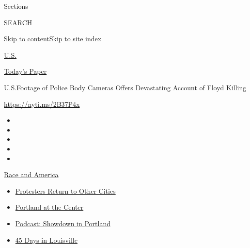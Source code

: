 Sections

SEARCH

\protect\hyperlink{site-content}{Skip to
content}\protect\hyperlink{site-index}{Skip to site index}

\href{https://www.nytimes3xbfgragh.onion/section/us}{U.S.}

\href{https://myaccount.nytimes3xbfgragh.onion/auth/login?response_type=cookie\&client_id=vi}{}

\href{https://www.nytimes3xbfgragh.onion/section/todayspaper}{Today's
Paper}

\href{/section/us}{U.S.}\textbar{}Footage of Police Body Cameras Offers
Devastating Account of Floyd Killing

\url{https://nyti.ms/2B37P4x}

\begin{itemize}
\item
\item
\item
\item
\item
\end{itemize}

\href{https://www.nytimes3xbfgragh.onion/news-event/george-floyd-protests-minneapolis-new-york-los-angeles?action=click\&pgtype=Article\&state=default\&region=TOP_BANNER\&context=storylines_menu}{Race
and America}

\begin{itemize}
\tightlist
\item
  \href{https://www.nytimes3xbfgragh.onion/2020/07/26/us/protests-portland-seattle-trump.html?action=click\&pgtype=Article\&state=default\&region=TOP_BANNER\&context=storylines_menu}{Protesters
  Return to Other Cities}
\item
  \href{https://www.nytimes3xbfgragh.onion/2020/07/24/us/portland-oregon-protests-white-race.html?action=click\&pgtype=Article\&state=default\&region=TOP_BANNER\&context=storylines_menu}{Portland
  at the Center}
\item
  \href{https://www.nytimes3xbfgragh.onion/2020/07/23/podcasts/the-daily/portland-protests.html?action=click\&pgtype=Article\&state=default\&region=TOP_BANNER\&context=storylines_menu}{Podcast:
  Showdown in Portland}
\item
  \href{https://www.nytimes3xbfgragh.onion/interactive/2020/07/16/us/black-lives-matter-protests-louisville-breonna-taylor.html?action=click\&pgtype=Article\&state=default\&region=TOP_BANNER\&context=storylines_menu}{45
  Days in Louisville}
\end{itemize}

